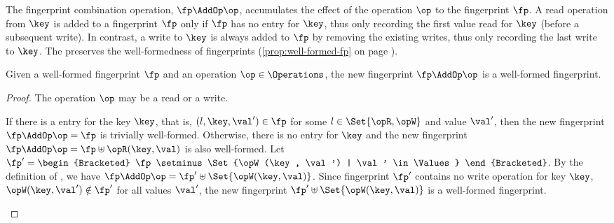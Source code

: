 The fingerprint combination operation, \( \fp \AddOp \op \), accumulates the effect of the operation \( \op \)
to the fingerprint \( \fp \).
A read operation from \(\key\) is added to a fingerprint \(\fp\) only if \(\fp\) has no entry for \(\key\),
thus only recording the first value read for \(\key\) (before a subsequent write). 
In contrast, a write to \(\key\) is always added to \(\fp\) by removing the existing writes,
thus only recording the last write to \(\key\). 
The \AddOp preserves the well-formedness of fingerprints (\cref{prop:well-formed-fp} on page \pageref{sec:proof-well-form-fingerprint-operations}).

\begin{toappendix}
\label{sec:proof-well-form-fingerprint-operations}
\begin{proposition}
\label{prop:well-formed-fp}
    Given a well-formed fingerprint \( \fp \) and an operation \( \op \in \Operations\),
    the new fingerprint \( \fp \AddOp \op \) is a well-formed fingerprint.
\end{proposition}
\begin{proof}
The operation \( \op \) may be a read or a write.
\begin{enumerate}
\Case{\(\op = \opR(\key,\val)\)}
    If there is a entry for the key \( \key \), that is,
    \( (l,\key,\val') \in \fp \) for some \( l \in \Set{\opR, \opW} \) and value \( \val' \),
    then the new fingerprint \( \fp \AddOp \op  = \fp \) is trivially well-formed.
    Otherwise, there is no entry for \( \key \) 
    and the new fingerprint \( \fp \AddOp \op = \fp \uplus \opR(\key,\val) \)
    is also well-formed.
\Case{\(\op = \opW(\key,\val)\)}
    Let \( \fp' = \begin{Bracketed} 
        \fp \setminus \Set{\opW(\key, \val') | \val' \in \Values} \end{Bracketed}\).
    By the definition of \AddOp, 
    we have \( \fp \AddOp \op = \fp' \uplus \Set{\opW(\key, \val)} \).
    Since fingerprint \( \fp' \) contains no write operation for key \( \key \),
    \( \opW(\key, \val') \notin \fp' \) for all values \( \val' \),
    the new fingerprint \( \fp' \uplus \Set{\opW(\key, \val)}\) is a well-formed fingerprint. \qedhere
\end{enumerate}
\end{proof}
\end{toappendix}
